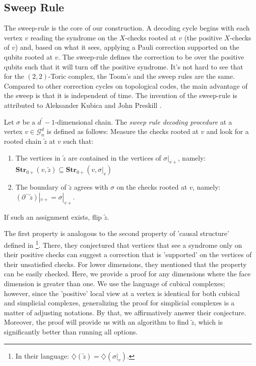 



\subsection{Sweep Rule}

The sweep-rule is the core of our construction. A decoding cycle begins with each vertex $v$ reading the syndrome on the $X$-checks rooted at $v$ (the positive $X$-checks of $v$) and, based on what it sees, applying a Pauli correction supported on the qubits rooted at $v$. The sweep-rule defines the correction to be over the positive qubits such that it will turn off the positive syndrome. It's not hard to see that for the $(2,2)$-Toric complex, the Toom's and the sweep rules are the same. Compared to other correction cycles on topological codes, the main advantage of the sweep is that it is independent of time. The invention of the sweep-rule is attributed to Aleksander Kubica and John Preskill \cite{Kubica_2019}. 

\begin{definition}
  \label{def:sweeprule}
  Let $\sigma$ be a $d^{\prime}-1$-dimensional chain. The \textit{sweep rule decoding procedure} at a vertex $v \in \mathcal{G}_{n}^{d}$ is defined as follows: Measure the checks rooted at $v$ and look for a rooted chain $\tilde{z}$ at $v$ such that: 
  \begin{enumerate}
    \item The vertices in $\tilde{z}$ are contained in the vertices of $\sigma|_{v+}$, namely: $ \mathbf{Str}_{0+}(v, \tilde{z}) \subseteq \mathbf{Str}_{0+}(v, \sigma|_{v})$ %
    \item The boundary of $\tilde{z}$ agrees with $\sigma$ on the checks rooted at $v$, namely: $(\partial^{-}\tilde{z})|_{v+} = \sigma|_{v+}$.
  \end{enumerate}
  If such an assignment exists, flip $\tilde{z}$.
\end{definition}

The first property is analogous to the second property of 'causal structure' defined in \cite{Kubica_2019}\footnote{In their language: $\diamondsuit(\tilde{z}) = \diamondsuit(\sigma|_{v})$.}. There, they conjectured that vertices that see a syndrome only on their positive checks can suggest a correction that is 'supported' on the vertices of their unsatisfied checks. For lower dimensions, they mentioned that the property can be easily checked. Here, we provide a proof for any dimensions where the face dimension is greater than one. We use the language of cubical complexes; however, since the 'positive' local view at a vertex is identical for both cubical and simplicial complexes, generalizing the proof for simplicial complexes is a matter of adjusting notations. By that, we affirmatively answer their conjecture. Moreover, the proof will provide us with an algorithm to find $\tilde{z}$, which is significantly better than running all options.

